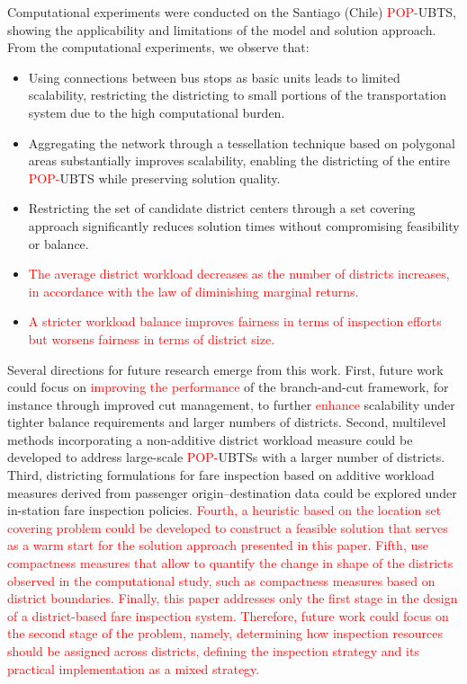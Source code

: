 \documentclass[preprint,11pt]{elsarticle}
\begin{document}
Computational experiments were conducted on the Santiago (Chile) \textcolor{red}{POP-}UBTS, showing the applicability and limitations of the model and solution approach.
From the computational experiments, we observe that:
\begin{itemize}
    \item Using connections between bus stops as basic units leads to limited scalability, restricting the districting to small portions of the transportation system due to the high computational burden.
    \item Aggregating the network through a tessellation technique based on polygonal areas substantially improves scalability, enabling the districting of the entire \textcolor{red}{POP-}UBTS while preserving solution quality.
    \item Restricting the set of candidate district centers through a set covering approach significantly reduces solution times without compromising feasibility or balance.
    \item \textcolor{red}{The average district workload decreases as the number of districts increases, in accordance with the law of diminishing marginal returns.}
    \item \textcolor{red}{A stricter workload balance improves fairness in terms of inspection efforts but worsens fairness in terms of district size.}
\end{itemize}

Several directions for future research emerge from this work.
First, future work could focus on \textcolor{red}{improving the performance} of the branch-and-cut framework, for instance through improved cut management, to further \textcolor{red}{enhance} scalability under tighter balance requirements and larger numbers of districts.
Second, multilevel methods incorporating a non-additive district workload measure could be developed to address large-scale \textcolor{red}{POP-}UBTSs with a larger number of districts.
Third, districting formulations for fare inspection based on additive workload measures derived from passenger origin--destination data could be explored under in-station fare inspection policies.
\textcolor{red}{Fourth, a heuristic based on the location set covering problem could be developed to construct a feasible solution that serves as a warm start for the solution approach presented in this paper.}
\textcolor{red}{Fifth, use compactness measures that allow to quantify the change in shape of the districts observed in the computational study, such as compactness measures based on district boundaries.}
\textcolor{red}{Finally, this paper addresses only the first stage in the design of a district-based fare inspection system. Therefore, future work could focus on the second stage of the problem, namely, determining how inspection resources should be assigned across districts, defining the inspection strategy and its practical implementation as a mixed strategy.}
\end{document}
